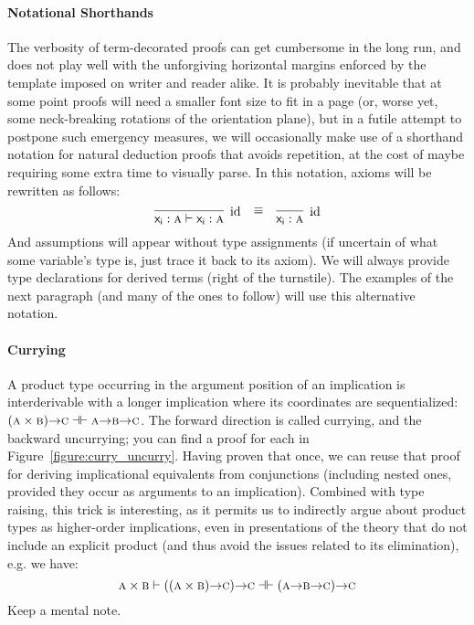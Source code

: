\paragraph{Notational Shorthands}
The verbosity of term-decorated proofs can get cumbersome in the long run, and does not play well with the unforgiving horizontal margins enforced by the template imposed on writer and reader alike.
It is probably inevitable that at some point proofs will need a smaller font size to fit in a page (or, worse yet, some neck-breaking rotations of the orientation plane), but in a futile attempt to postpone such emergency measures, we will occasionally make use of a shorthand notation for natural deduction proofs that avoids repetition, at the cost of maybe requiring some extra time to visually parse.
In this notation, axioms will be rewritten as follows:
\[
\infer[\Ax]{\term{x_i}: \prop{A} \vdash \term{x_i}: \prop{A}}{} \quad \raisebox{7pt}{$\equiv$} \quad \infer[\Ax]{\term{x_i}:\prop{A}}{}
\]
And assumptions will appear without type assignments (if uncertain of what some variable's type is, just trace it back to its axiom). 
We will always provide type declarations for derived terms (right of the turnstile).
The examples of the next paragraph (and many of the ones to follow) will use this alternative notation.

\paragraph{Currying}
A product type occurring in the argument position of an implication is interderivable with a longer implication where its coordinates are sequentialized: $(\smallprop{A}\times\smallprop{B}) \ii \smallprop{C} \dashv \vdash \smallprop{A} \ii \smallprop{B} \ii \smallprop{C}$.
The forward direction is called currying, and the backward uncurrying; you can find a proof for each in Figure~\ref{figure:curry_uncurry}.
Having proven that once, we can reuse that proof for deriving implicational equivalents from conjunctions (including nested ones, provided they occur as arguments to an implication).
Combined with type raising, this trick is interesting, as it permits us to indirectly argue about product types as higher-order implications, even in presentations of the theory that do not include an explicit product (and thus avoid the issues related to its elimination), e.g. we have:
\[
	\prop{A} \times \prop{B} \vdash ((\prop{A} \times \prop{B}) \ii \prop{C}) \ii \prop{C} \dashv \vdash (\prop{A} \ii \prop{B} \ii \prop{C}) \ii \prop{C}
\]
Keep a mental note.

